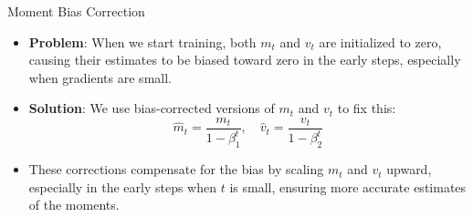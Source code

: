 \documentclass[serif, aspectratio=169]{beamer}
\begin{document}
\begin{frame}{Moment Bias Correction}
    \begin{itemize}
        \item \textbf{Problem}: When we start training, both $m_{t}$ and $v_{t}$ are initialized to zero, causing their estimates to be biased toward zero in the early steps, especially when gradients are small.
        \item \textbf{Solution}: We use bias-corrected versions of $m_{t}$ and $v_{t}$ to fix this:
        \[\hat{m}_{t} = \frac{m_{t}}{1 - \beta_1^{t}}, \quad 
        \hat{v}_{t} = \frac{v_{t}}{1 -\beta_2^{t}}\]
        \item These corrections compensate for the bias by scaling $m_{t}$ and $v_{t}$ upward, especially in the early steps when $t$ is small, ensuring more accurate estimates of the moments.
    \end{itemize}
\end{frame}



\end{document}
